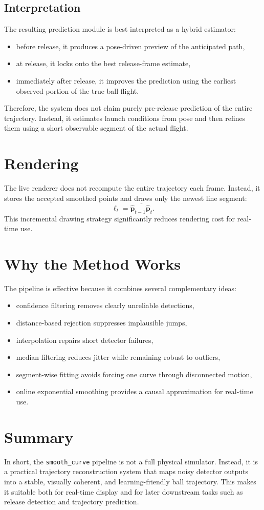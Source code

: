 \documentclass[11pt]{article}
\begin{document}
\subsection{Interpretation}
The resulting prediction module is best interpreted as a hybrid estimator:
\begin{itemize}
    \item before release, it produces a pose-driven preview of the anticipated path,
    \item at release, it locks onto the best release-frame estimate,
    \item immediately after release, it improves the prediction using the earliest observed portion of the true ball flight.
\end{itemize}
Therefore, the system does not claim purely pre-release prediction of the entire trajectory. Instead, it estimates launch conditions from pose and then refines them using a short observable segment of the actual flight.

\section{Rendering}
The live renderer does not recompute the entire trajectory each frame. Instead, it stores the accepted smoothed points and draws only the newest line segment:
\begin{equation}
    \ell_t = \overline{\hat{\bm{p}}_{t-1}\hat{\bm{p}}_t}.
\end{equation}
This incremental drawing strategy significantly reduces rendering cost for real-time use.

\section{Why the Method Works}
The pipeline is effective because it combines several complementary ideas:
\begin{itemize}
    \item confidence filtering removes clearly unreliable detections,
    \item distance-based rejection suppresses implausible jumps,
    \item interpolation repairs short detector failures,
    \item median filtering reduces jitter while remaining robust to outliers,
    \item segment-wise fitting avoids forcing one curve through disconnected motion,
    \item online exponential smoothing provides a causal approximation for real-time use.
\end{itemize}

\section{Summary}
In short, the \texttt{smooth\_curve} pipeline is not a full physical simulator. Instead, it is a practical trajectory reconstruction system that maps noisy detector outputs into a stable, visually coherent, and learning-friendly ball trajectory. This makes it suitable both for real-time display and for later downstream tasks such as release detection and trajectory prediction.
\end{document}
